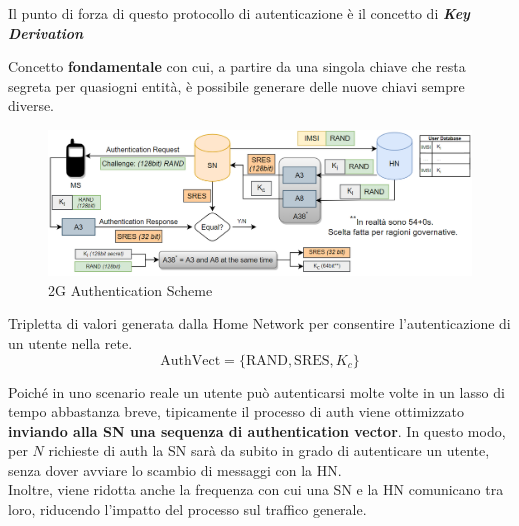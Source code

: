 Il punto di forza di questo protocollo di autenticazione è il concetto di \textit{\textbf{Key Derivation}}
\begin{definition}\label{def:keyderiv}
Concetto \textbf{fondamentale} con cui, a partire da una singola chiave che resta segreta per quasi\footnotemark ogni entità, è possibile generare delle nuove chiavi sempre diverse. 
\end{definition}
\begin{figure}[ht]
    \centering
    \includegraphics[width=\linewidth]{image/2gauth.png}
    \caption{2G Authentication Scheme}
    \label{fig:2gauth}
\end{figure}
\begin{corollary}\label{cor:authvect}
Tripletta di valori generata dalla Home Network per consentire l'autenticazione di un utente nella rete.
\begin{equation*}
    \text{AuthVect}=\{\text{RAND}, \text{SRES}, K_c\}
\end{equation*}
\end{corollary}
Poiché in uno scenario reale un utente può autenticarsi molte volte in un lasso di tempo abbastanza breve, tipicamente il processo di auth viene ottimizzato \textbf{inviando alla SN una sequenza di authentication vector}. In questo modo, per $N$ richieste di auth la SN sarà da subito in grado di autenticare un utente, senza dover avviare lo scambio di messaggi con la HN.\\
Inoltre, viene ridotta anche la frequenza con cui una SN e la HN comunicano tra loro, riducendo l'impatto del processo sul traffico generale.
